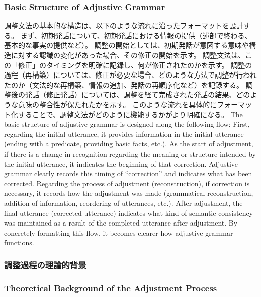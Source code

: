 \documentclass[a4paper]{article}
\begin{document}
\subsubsection{Basic Structure of Adjustive Grammar}
\fi

\ifJPN
調整文法の基本的な構造は、以下のような流れに沿ったフォーマットを設計する。
まず、初期発話について、初期発話における情報の提供（述部で終わる、基本的な事実の提供など）。
調整の開始としては、初期発話が意図する意味や構造に対する認識の変化があった場合、その修正の開始を示す。
調整文法は、この「修正」のタイミングを明確に記録し、何が修正されたのかを示す。
調整の過程（再構築）については、修正が必要な場合、どのような方法で調整が行われたのか（文法的な再構築、情報の追加、発話の再順序化など）を記録する。
調整後の発話（修正発話）については、調整を経て完成された発話の結果、どのような意味の整合性が保たれたかを示す。
このような流れを具体的にフォーマット化することで、調整文法がどのように機能するかがより明確になる。
\else
The basic structure of adjustive grammar is designed along the following flow:
First, regarding the initial utterance, it provides information in the initial utterance (ending with a predicate, providing basic facts, etc.).
As the start of adjustment, if there is a change in recognition regarding the meaning or structure intended by the initial utterance, it indicates the beginning of that correction.
Adjustive grammar clearly records this timing of ``correction'' and indicates what has been corrected.
Regarding the process of adjustment (reconstruction), if correction is necessary, it records how the adjustment was made (grammatical reconstruction, addition of information, reordering of utterances, etc.).
After adjustment, the final utterance (corrected utterance) indicates what kind of semantic consistency was maintained as a result of the completed utterance after adjustment.
By concretely formatting this flow, it becomes clearer how adjustive grammar functions.
\fi

\ifJPN
\subsubsection{調整過程の理論的背景}
\else
\subsubsection{Theoretical Background of the Adjustment Process}
\fi
\end{document}
